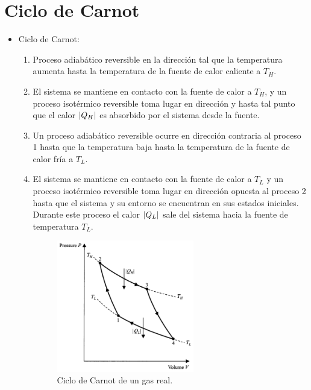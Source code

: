 \section{Ciclo de Carnot}
\begin{itemize}
\item Ciclo de Carnot: 
\begin{enumerate}
\item Proceso adiabático reversible en la dirección tal que 
la temperatura aumenta hasta la temperatura de la fuente 
de calor caliente a $T_H$.
\item El sistema se mantiene en contacto con la fuente
de calor a $T_H$, y un proceso isotérmico reversible 
toma lugar en dirección y hasta tal punto que 
el calor $\abs{Q_H}$ es absorbido por el sistema desde 
la fuente. 
\item Un proceso adiabático reversible ocurre en dirección 
contraria al proceso 1 hasta que la temperatura baja hasta 
la temperatura de la fuente de calor fría a $T_L$.
\item El sistema se mantiene en contacto con la fuente de 
calor a $T_L$ y un proceso isotérmico reversible toma lugar 
en dirección opuesta al proceso 2 hasta que el sistema y 
su entorno se encuentran en sus estados iniciales. Durante
este proceso el calor $\abs{Q_L}$ sale del sistema hacia la fuente
de temperatura $T_L$.
\begin{figure}
  \centering
  \includegraphics[width=6cm]{images/carnot-cycle.png}
  \caption{Ciclo de Carnot de un gas real.}
  \label{fig:diesel-cycle}
\end{figure}

\newpage


\end{enumerate}
\end{itemize}
